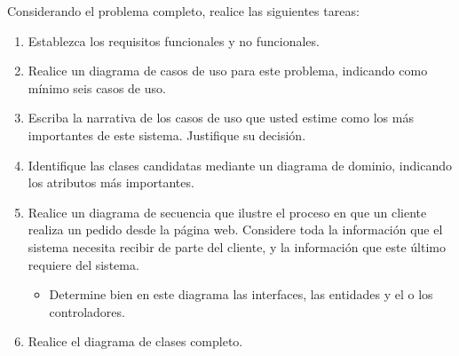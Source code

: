 \documentclass[11pt,letterpaper]{article}
\begin{document}
\begin{spacing}{1.2}
\begin{Problem}
    Considerando el problema completo, realice las siguientes tareas:

    \begin{enumerate}
        \item Establezca los requisitos funcionales y no funcionales.
        \item Realice un diagrama de casos de uso para este problema, indicando como mínimo seis
            casos de uso.
        \item Escriba la narrativa de los  casos de uso que usted estime como los más
            importantes de este sistema. Justifique su decisión.
        \item Identifique las clases candidatas mediante un diagrama de dominio, indicando 
            los atributos más importantes.
        \item Realice un diagrama de secuencia que ilustre el proceso en que un cliente
            realiza un pedido desde la página web. Considere toda la información que el sistema necesita
            recibir de parte del cliente, y la información que este último requiere del sistema.
        \begin{itemize}
            \item Determine bien en este diagrama las interfaces, las entidades y el o los controladores.
        \end{itemize}
        \item Realice el diagrama de clases completo.
    \end{enumerate}


\end{Problem}

\end{spacing}
\end{document}

